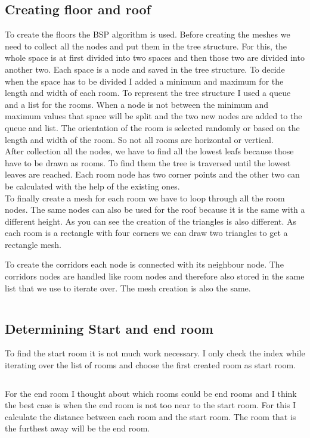 \documentclass[a4paper,11pt,oneside]{scrreprt}
\begin{document}
\subsection{Creating floor and roof}
To create the floors the BSP algorithm is used. Before creating the meshes we need to collect all the nodes and put them in the tree structure. For this, the whole space is at first divided into two spaces and then those two are divided into another two. Each space is a node and saved in the tree structure. To decide when the space has to be divided I added a minimum and maximum for the length and width of each room. To represent the tree structure I used a queue and a list for the rooms. When a node is not between the minimum and maximum values that space will be split and the two new nodes are added to the queue and list. The orientation of the room is selected randomly or based on the length and width of the room. So not all rooms are horizontal or vertical.
\\
After collection all the nodes, we have to find all the lowest leafs because those have to be drawn as rooms. To find them the tree is traversed until the lowest leaves are reached. Each room node has two corner points and the other two can be calculated with the help of the existing ones. 
\\
To finally create a mesh for each room we have to loop through all the room nodes. The same nodes can also be used for the roof because it is the same with a different height. As you can see the creation of the triangles is also different. As each room is a rectangle with four corners we can draw two triangles to get a rectangle mesh.

\newpage
To create the corridors each node is connected with its neighbour node. The corridors nodes are handled like room nodes and therefore also stored in the same list that we use to iterate over. The mesh creation is also the same.
\inputminted[fontsize=\footnotesize,linenos]{csharp}{code/CreateFloorRoof.cs}

\subsection{Determining Start and end room}
To find the start room it is not much work necessary. I only check the index while iterating over the list of rooms and choose the first created room as start room. 
\inputminted[fontsize=\footnotesize,linenos]{csharp}{code/StartRoom.cs}

For the end room I thought about which rooms could be end rooms and I think the best case is when the end room is not too near to the start room. For this I calculate the distance between each room and the start room. The room that is the furthest away will be the end room.
\inputminted[fontsize=\footnotesize,linenos]{csharp}{code/EndRoom.cs}
\end{document}
